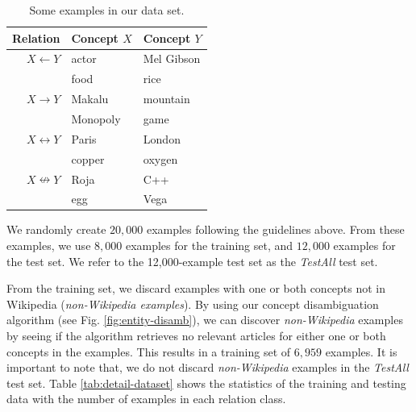 \begin{table}[h]
  \centering
  \begin{tabular}{|r|l|l|}
    \hline
    Relation          & Concept $X$ & Concept $Y$    \\
    \hline
    \hline
    $X \leftarrow Y$        & actor             & Mel Gibson           \\
    & food              & rice                 \\
    \hline                               
    $X \rightarrow Y$       & Makalu            & mountain             \\
    & Monopoly          & game                 \\
    \hline                               
    $X \leftrightarrow Y$   & Paris             & London               \\
    & copper            & oxygen                \\
    \hline                               
    $X \nleftrightarrow Y$ & Roja              & C++                  \\
    & egg               & Vega                  \\
    \hline
  \end{tabular}
  \caption{Some examples in our data set.}
  \label{table:examples}
\end{table}

We randomly create $20,000$ examples following the guidelines
above. From these examples, we use $8,000$ examples for the training
set, and $12,000$ examples for the test set. We refer to the
12,000-example test set as the {\em TestAll} test set.

From the training set, we discard examples with one or both concepts
not in Wikipedia ({\em non-Wikipedia examples}).  By using our concept
disambiguation algorithm (see Fig. \ref{fig:entity-disamb}), we can
discover {\em non-Wikipedia} examples by seeing if the algorithm
retrieves no relevant articles for either one or both concepts in the
examples. This results in a training set of $6,959$ examples.  It is
important to note that, we do not discard {\em non-Wikipedia} examples
in the {\em TestAll} test set. Table \ref{tab:detail-dataset} shows
the statistics of the training and testing data with the number of
examples in each relation class.


